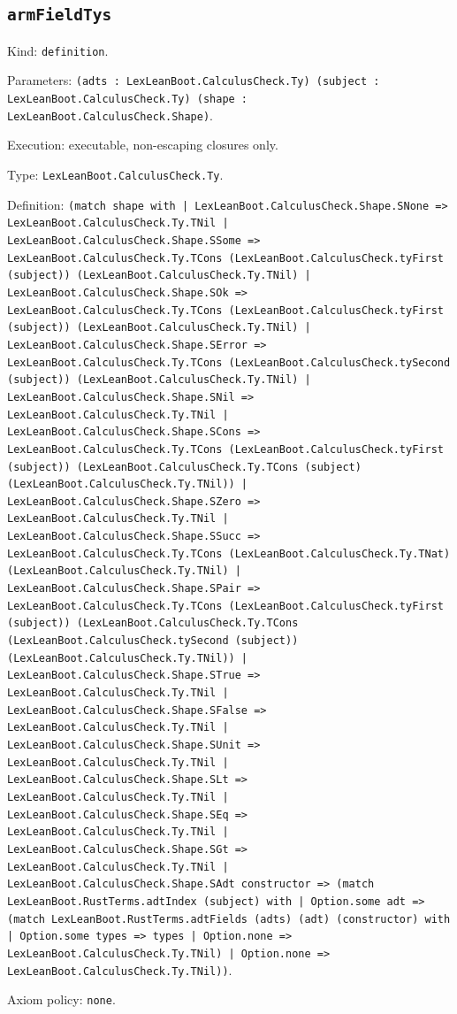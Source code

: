 \documentclass[11pt]{article}
\begin{document}
\subsection*{\texttt{armFieldTys}}
\noindent Kind: \texttt{definition}.\par
\noindent Parameters: \texttt{(adts : LexLeanBoot.CalculusCheck.Ty) (subject : LexLeanBoot.CalculusCheck.Ty) (shape : LexLeanBoot.CalculusCheck.Shape)}.\par
\noindent Execution: executable, non-escaping closures only.\par
\noindent Type: \texttt{LexLeanBoot.CalculusCheck.Ty}.\par
\noindent Definition: \texttt{(match shape with | LexLeanBoot.CalculusCheck.Shape.SNone => LexLeanBoot.CalculusCheck.Ty.TNil | LexLeanBoot.CalculusCheck.Shape.SSome => LexLeanBoot.CalculusCheck.Ty.TCons (LexLeanBoot.CalculusCheck.tyFirst (subject)) (LexLeanBoot.CalculusCheck.Ty.TNil) | LexLeanBoot.CalculusCheck.Shape.SOk => LexLeanBoot.CalculusCheck.Ty.TCons (LexLeanBoot.CalculusCheck.tyFirst (subject)) (LexLeanBoot.CalculusCheck.Ty.TNil) | LexLeanBoot.CalculusCheck.Shape.SError => LexLeanBoot.CalculusCheck.Ty.TCons (LexLeanBoot.CalculusCheck.tySecond (subject)) (LexLeanBoot.CalculusCheck.Ty.TNil) | LexLeanBoot.CalculusCheck.Shape.SNil => LexLeanBoot.CalculusCheck.Ty.TNil | LexLeanBoot.CalculusCheck.Shape.SCons => LexLeanBoot.CalculusCheck.Ty.TCons (LexLeanBoot.CalculusCheck.tyFirst (subject)) (LexLeanBoot.CalculusCheck.Ty.TCons (subject) (LexLeanBoot.CalculusCheck.Ty.TNil)) | LexLeanBoot.CalculusCheck.Shape.SZero => LexLeanBoot.CalculusCheck.Ty.TNil | LexLeanBoot.CalculusCheck.Shape.SSucc => LexLeanBoot.CalculusCheck.Ty.TCons (LexLeanBoot.CalculusCheck.Ty.TNat) (LexLeanBoot.CalculusCheck.Ty.TNil) | LexLeanBoot.CalculusCheck.Shape.SPair => LexLeanBoot.CalculusCheck.Ty.TCons (LexLeanBoot.CalculusCheck.tyFirst (subject)) (LexLeanBoot.CalculusCheck.Ty.TCons (LexLeanBoot.CalculusCheck.tySecond (subject)) (LexLeanBoot.CalculusCheck.Ty.TNil)) | LexLeanBoot.CalculusCheck.Shape.STrue => LexLeanBoot.CalculusCheck.Ty.TNil | LexLeanBoot.CalculusCheck.Shape.SFalse => LexLeanBoot.CalculusCheck.Ty.TNil | LexLeanBoot.CalculusCheck.Shape.SUnit => LexLeanBoot.CalculusCheck.Ty.TNil | LexLeanBoot.CalculusCheck.Shape.SLt => LexLeanBoot.CalculusCheck.Ty.TNil | LexLeanBoot.CalculusCheck.Shape.SEq => LexLeanBoot.CalculusCheck.Ty.TNil | LexLeanBoot.CalculusCheck.Shape.SGt => LexLeanBoot.CalculusCheck.Ty.TNil | LexLeanBoot.CalculusCheck.Shape.SAdt constructor => (match LexLeanBoot.RustTerms.adtIndex (subject) with | Option.some adt => (match LexLeanBoot.RustTerms.adtFields (adts) (adt) (constructor) with | Option.some types => types | Option.none => LexLeanBoot.CalculusCheck.Ty.TNil) | Option.none => LexLeanBoot.CalculusCheck.Ty.TNil))}.\par
\noindent Axiom policy: \texttt{none}.\par
\end{document}
